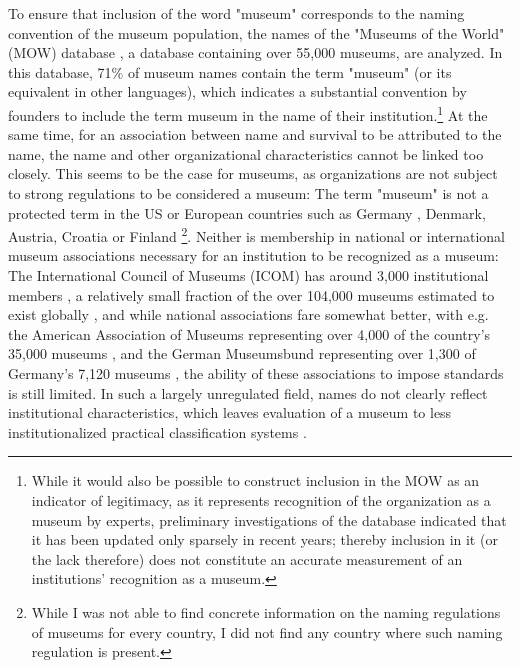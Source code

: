 \documentclass[12pt]{article}
\begin{document}
To ensure that inclusion of the word "museum" corresponds to the naming convention of the museum population, the names of the "Museums of the World" (MOW) database \parencite{deGruyter_2021_MOW}, a database containing over 55,000 museums, are analyzed.
In this database, 71\% of museum names contain the term "museum" (or its equivalent in other languages), which indicates a substantial convention by founders to include the term museum in the name of their institution.\footnote{While it would also be possible to construct inclusion in the MOW as an indicator of legitimacy, as it represents recognition of the organization as a museum by experts, preliminary investigations of the database indicated that it has been updated only sparsely in recent years; thereby inclusion in it (or the lack therefore) does not constitute an accurate measurement of an institutions' recognition as a museum.}
At the same time, for an association between name and survival to be attributed to the name, the name and other organizational characteristics cannot be linked too closely.
This seems to be the case for museums, as organizations are not subject to strong regulations to be considered a museum: 
The term "museum" is not a protected term in the US \parencite[p.205]{Moore_2022_best} or European countries such as Germany \parencite[p.4]{Museumsbund_ICOMDE_2006_standards}, Denmark, Austria, Croatia or Finland \parencite{EGMUS_2024_reports}\footnote{While I was not able to find concrete information on the naming regulations of museums for every country, I did not find any country where such naming regulation is present.}.
Neither is membership in national or international museum associations necessary for an institution to be recognized as a museum: 
The International Council of Museums (ICOM) has around 3,000 institutional members \parencite{ICOM_2020_report19}, a relatively small fraction of the over 104,000 museums estimated to exist globally \parencite{UNESCO_2021_covid}, and while national associations fare somewhat better, with e.g. the American Association of Museums representing over 4,000 of the country's 35,000 museums \parencite{LOC_2019_AAM}, and the German Museumsbund representing over 1,300 \parencite{Museumsbund_2024_mitgliedmuseen} of Germany's 7,120 museums \parencite{IMF_2024_museumsstatistik}, the ability of these associations to impose standards is still limited.
In such a largely unregulated field, names do not clearly reflect institutional characteristics, which leaves evaluation of a museum to less institutionalized practical classification systems \parencite{van_Venrooij_2018_fuzziness}.
\end{document}
